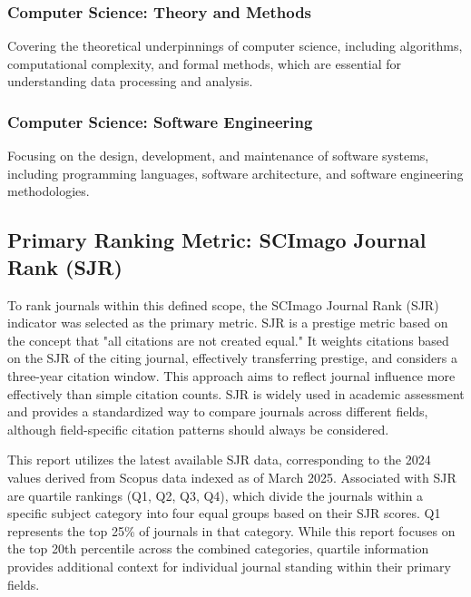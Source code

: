 \documentclass[../main.tex]{subfiles}
\begin{document}
\subsubsection{Computer Science: Theory and Methods}
\vspace{0.2cm}
\noindent
Covering the theoretical underpinnings of computer science, including algorithms, computational complexity, and formal methods, which are essential for understanding data processing and analysis.

\subsubsection{Computer Science: Software Engineering}
\vspace{0.2cm}
\noindent
Focusing on the design, development, and maintenance of software systems, including programming languages, software architecture, and software engineering methodologies.

\subsection{Primary Ranking Metric: SCImago Journal Rank (SJR)}

\vspace{0.4cm}
\noindent
To rank journals within this defined scope, the SCImago Journal Rank (SJR) indicator was selected as the primary metric. SJR is a prestige metric based on the concept that "all citations are not created equal." It weights citations based on the SJR of the citing journal, effectively transferring prestige, and considers a three-year citation window. This approach aims to reflect journal influence more effectively than simple citation counts. SJR is widely used in academic assessment and provides a standardized way to compare journals across different fields, although field-specific citation patterns should always be considered.

\vspace{0.4cm}
\noindent
This report utilizes the latest available SJR data, corresponding to the 2024 values derived from Scopus data indexed as of March 2025. Associated with SJR are quartile rankings (Q1, Q2, Q3, Q4), which divide the journals within a specific subject category into four equal groups based on their SJR scores. Q1 represents the top 25\% of journals in that category. While this report focuses on the top 20th percentile across the combined categories, quartile information provides additional context for individual journal standing within their primary fields.
\end{document}

